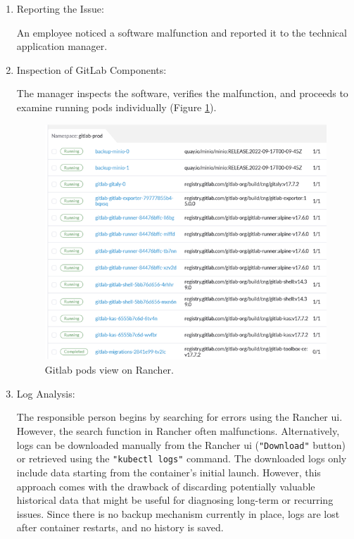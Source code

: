 \documentclass[../main.tex]{subfiles}
\begin{document}
\begin{enumerate}
    \item Reporting the Issue: 
    
    An employee noticed a software malfunction and reported it to the technical application manager.
    
    \item Inspection of GitLab Components: 
    
    The manager inspects the software, verifies the malfunction, and proceeds to examine running pods individually (Figure \ref{fig:gitlab}).
    
    \begin{figure}[H]
        \centering
        \includegraphics[]{img/3-background/gitlab/gitlab.png}
        \caption{Gitlab pods view on Rancher.}
        \label{fig:gitlab}
    \end{figure}
    
    \item Log Analysis: 
    
    The responsible person begins by searching for errors using the Rancher \gls{ui}. However, the search function in Rancher often malfunctions. Alternatively, logs can be downloaded manually from the Rancher \gls{ui} (\texttt{"Download"} button) or retrieved using the \texttt{"kubectl logs"} command. The downloaded logs only include data starting from the container’s initial launch. However, this approach comes with the drawback of discarding potentially valuable historical data that might be useful for diagnosing long-term or recurring issues. Since there is no backup mechanism currently in place, logs are lost after container restarts, and no history is saved.


\end{enumerate}
\end{document}
